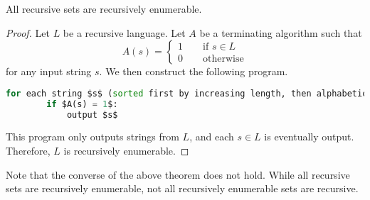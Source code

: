 \begin{theorem}
    All recursive sets are recursively enumerable.
\end{theorem}
\begin{proof}
    Let \(L\) be a recursive language. Let \(A\) be a terminating algorithm such that
    \[
        A(s) = 
        \begin{cases}
            1 \hspace{2em}\text{if } s \in L\\
            0 \hspace{2em}\text{otherwise}
        \end{cases}
    \]
    for any input string \(s\). We then construct the following program.
    \begin{lstlisting}[language=python, commentstyle=\color{gray}]
    for each string $s$ (sorted first by increasing length, then alphabetically):
        if $A(s) = 1$:
            output $s$
    \end{lstlisting}
    This program only outputs strings from \(L\), and each \(s\in L\) is eventually output. Therefore, \(L\) is recursively enumerable.
\end{proof}

Note that the converse of the above theorem does not hold. While all recursive sets are recursively enumerable, not all recursively enumerable sets are recursive.